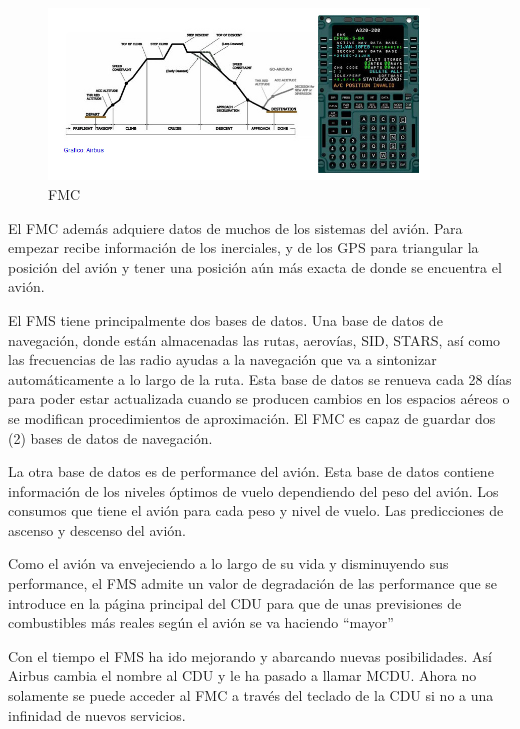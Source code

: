 \begin{figure}[!h]
  \centering
  \includegraphics[width=0.9\textwidth]{01.tablero.instrumentos/imagenes/1.4.pantalla.electronica/fms_plan_vuelo.jpg}
   \caption{FMC}
\label{fig:01.FMC}
\end{figure}

El \ac{FMC} adem\'as adquiere datos de muchos de los sistemas del avi\'on. Para empezar recibe informaci\'on de los inerciales, y de los \ac{GPS} para triangular la posici\'on del avi\'on y tener una posici\'on a\'un m\'as exacta de donde se encuentra el avi\'on.

El \ac{FMS} tiene principalmente dos bases de datos. Una base de datos de navegaci\'on, donde est\'an almacenadas las rutas, aerov\'ias, \ac{SID}, \ac{STARS}, as\'i como las frecuencias de las radio ayudas a la navegaci\'on que va a sintonizar autom\'aticamente a lo largo de la ruta. Esta base de datos se renueva cada 28 d\'ias para poder estar actualizada cuando se producen cambios en los espacios a\'ereos o se modifican procedimientos de aproximaci\'on. 
El \ac{FMC} es capaz de guardar dos (2)  bases de datos de navegaci\'on.

La otra base de datos es de performance del avi\'on. Esta base de datos contiene informaci\'on de los niveles \'optimos de vuelo dependiendo del peso del avi\'on. Los consumos que tiene el avi\'on para cada peso y nivel de vuelo. Las predicciones de ascenso y descenso del avi\'on.

Como el avi\'on va envejeciendo a lo largo de su vida y disminuyendo sus performance, el \ac{FMS} admite un valor de degradaci\'on de las performance que se introduce en la p\'agina principal del \ac{CDU} para que de unas previsiones de combustibles m\'as reales seg\'un el avi\'on se va haciendo ``mayor''

Con el tiempo el \ac{FMS} ha ido mejorando y abarcando nuevas posibilidades. As\'i Airbus cambia el nombre 
al \ac{CDU} y le ha pasado a llamar \ac{MCDU}. Ahora no solamente se puede acceder 
al \ac{FMC} a trav\'es del teclado de la \ac{CDU} si no a una infinidad de nuevos servicios.

